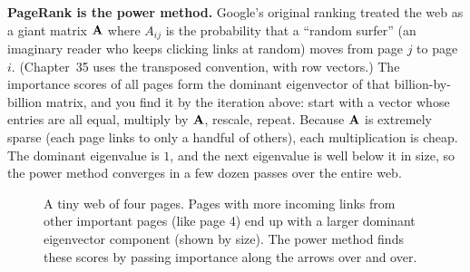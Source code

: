 \begin{applicationbox}
\textbf{PageRank is the power method.} Google's original ranking treated the web as a
giant matrix $\mathbf{A}$ where $A_{ij}$ is the probability that a ``random surfer'' (an
imaginary reader who keeps clicking links at random) moves from page $j$ to page $i$.
(Chapter~35 uses the transposed convention, with row vectors.) The importance scores of
all pages form the dominant eigenvector of that billion-by-billion matrix, and you find
it by the iteration above: start with a vector whose entries are all equal, multiply by
$\mathbf{A}$, rescale, repeat. Because $\mathbf{A}$ is extremely sparse (each page links to
only a handful of others), each multiplication is cheap. The dominant eigenvalue is $1$,
and the next eigenvalue is well below it in size, so the power method converges in a few
dozen passes over the entire web.
\end{applicationbox}

\begin{figure}[htbp]
\centering
{}
\caption{A tiny web of four pages. Pages with more incoming links from other important pages (like page 4) end up with a larger dominant eigenvector component (shown by size). The power method finds these scores by passing importance along the arrows over and over.}
\label{ch33:pagerank}
\end{figure}

